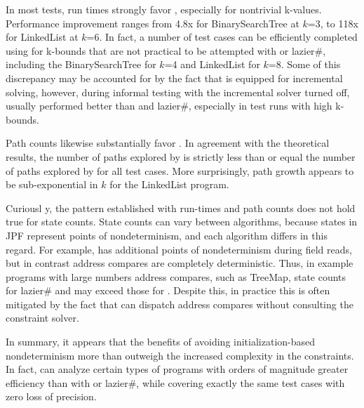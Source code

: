 In most tests, run times strongly favor \symtxt{}, especially for nontrivial k-values. Performance improvement ranges from 4.8x for BinarySearchTree at $k$=3, to 118x for LinkedList at $k$=6. In fact, a number of test cases can be efficiently completed using \symtxt{} for k-bounds that are not practical to be attempted with \gsetxt{} or lazier\#, including the BinarySearchTree for $k$=4 and LinkedList for $k$=8. Some of this discrepancy may be accounted for by the fact that \symtxt{} is equipped for incremental solving, however, during informal testing with the incremental solver turned off, \symtxt{} usually performed better than \gsetxt{} and lazier\#, especially in test runs with high k-bounds. 

Path counts likewise substantially favor \symtxt{}. In agreement with the theoretical results, the number of paths explored by \symtxt{} is strictly less than or equal the number of paths explored by \gsetxt{} for all test cases. More surprisingly, \symtxt{} path growth appears to be sub-exponential in $k$ for the LinkedList program.

Curiousl y, the pattern established with run-times and path counts does not hold true for state counts. State counts can vary between algorithms, because states in JPF represent points of nondeterminism, and each algorithm differs in this regard. For example, \gsetxt{} has additional points of nondeterminism during field reads, but in contrast address compares are completely deterministic. Thus, in example programs with large numbers address compares, such as TreeMap, state counts for lazier\# and \symtxt{} may exceed those for \gsetxt{}. Despite this, in practice this is often mitigated by the fact that \symtxt{} can dispatch address compares without consulting the constraint solver.

In summary, it appears that the benefits of avoiding
initialization-based nondeterminism more than outweigh the increased
complexity in the constraints. In fact, \symtxt{} can analyze certain
types of programs with orders of magnitude greater efficiency than
with \gsetxt{} or lazier\#, while covering exactly the same test cases
with zero loss of precision.
